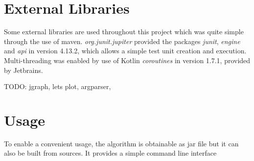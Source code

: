 \section{External Libraries}
\label{ch:Implementation:external-libs}
Some external libraries are used throughout this project which was quite simple through the use of maven. \emph{org.junit.jupiter} provided the packages \emph{junit}, \emph{engine} and \emph{api} in version 4.13.2, which allows a simple test unit creation and execution. Multi-threading was enabled by use of Kotlin \emph{coroutines} in version 1.7.1, provided by Jetbrains.

TODO: jgraph, lets plot, argparser, 

\section{Usage}
\label{ch:Implementation:usage}
To enable a convenient usage, the algorithm is obtainable as jar file but it can also be built from sources. It provides a simple command line interface

